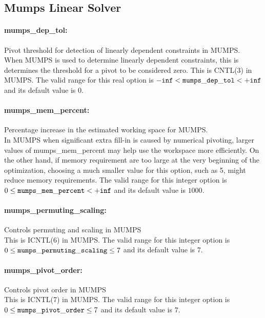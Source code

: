 \subsection{Mumps Linear Solver}
\label{sec:MumpsLinearSolver}
\paragraph{mumps\_dep\_tol:}\label{opt:mumps_dep_tol} Pivot threshold for detection of linearly dependent constraints in MUMPS. \\
 When MUMPS is used to determine linearly dependent constraints, this is determines the threshold for a pivot to be considered zero.  This is CNTL(3) in MUMPS. The valid range for this real option is 
${\tt -inf} <  {\tt mumps\_dep\_tol } <  {\tt +inf}$
and its default value is $0$.


\paragraph{mumps\_mem\_percent:}\label{opt:mumps_mem_percent} Percentage increase in the estimated working space for MUMPS. \\
 In MUMPS when significant extra fill-in is caused by numerical pivoting, larger values of mumps\_mem\_percent may help use the workspace more efficiently.  On the other hand, if memory requirement are too large at the very beginning of the optimization, choosing a much smaller value for this option, such as 5, might reduce memory requirements. The valid range for this integer option is
$0 \le {\tt mumps\_mem\_percent } <  {\tt +inf}$
and its default value is $1000$.


\paragraph{mumps\_permuting\_scaling:}\label{opt:mumps_permuting_scaling} Controls permuting and scaling in MUMPS \\
 This is ICNTL(6) in MUMPS. The valid range for this integer option is
$0 \le {\tt mumps\_permuting\_scaling } \le 7$
and its default value is $7$.


\paragraph{mumps\_pivot\_order:}\label{opt:mumps_pivot_order} Controls pivot order in MUMPS \\
 This is ICNTL(7) in MUMPS. The valid range for this integer option is
$0 \le {\tt mumps\_pivot\_order } \le 7$
and its default value is $7$.


